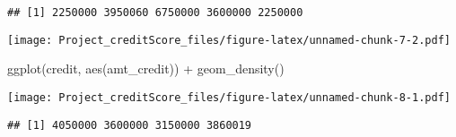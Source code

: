 \documentclass[
]{article}
\newenvironment{Shaded}{\begin{snugshade}}{\end{snugshade}}
\newcommand{\AttributeTok}[1]{\textcolor[rgb]{0.77,0.63,0.00}{#1}}
\newcommand{\DecValTok}[1]{\textcolor[rgb]{0.00,0.00,0.81}{#1}}
\newcommand{\FunctionTok}[1]{\textcolor[rgb]{0.00,0.00,0.00}{#1}}
\newcommand{\NormalTok}[1]{#1}
\newcommand{\OtherTok}[1]{\textcolor[rgb]{0.56,0.35,0.01}{#1}}
\newcommand{\SpecialCharTok}[1]{\textcolor[rgb]{0.00,0.00,0.00}{#1}}
\begin{document}
\begin{verbatim}
## [1] 2250000 3950060 6750000 3600000 2250000
\end{verbatim}

\begin{Shaded}
\end{Shaded}

\texttt{[image: Project\_creditScore\_files/figure-latex/unnamed-chunk-7-2.pdf]}

\begin{Shaded}
\begin{Highlighting}[]
\FunctionTok{ggplot}\NormalTok{(credit, }\FunctionTok{aes}\NormalTok{(amt\_credit)) }\SpecialCharTok{+}
  \FunctionTok{geom\_density}\NormalTok{()}
\end{Highlighting}
\end{Shaded}

\texttt{[image: Project\_creditScore\_files/figure-latex/unnamed-chunk-8-1.pdf]}

\begin{Shaded}
\end{Shaded}

\begin{verbatim}
## [1] 4050000 3600000 3150000 3860019
\end{verbatim}
\end{document}
